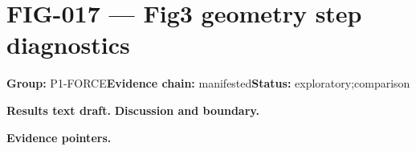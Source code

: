 \clearpage
\section{FIG-017 --- Fig3 geometry step diagnostics}
\label{figpage:fig-017}
\textbf{Group:} P1-FORCE\quad \textbf{Evidence chain:} manifested\quad \textbf{Status:} exploratory;comparison

\textbf{Results text draft.} 
\textbf{Discussion and boundary.} 


\textbf{Evidence pointers.}



\vfill
